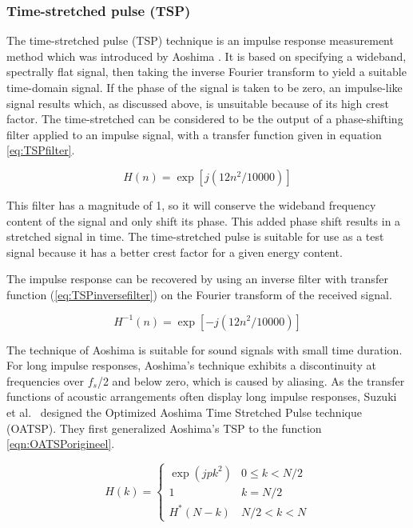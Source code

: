 \subsubsection{Time-stretched pulse (TSP)}
The time-stretched pulse (TSP) technique is an impulse response measurement method which was introduced by Aoshima \cite{Aoshima19811484}. It is based on specifying a wideband, spectrally flat signal, then taking the inverse Fourier transform to yield a suitable time-domain signal. If the phase of the signal is taken to be zero, an impulse-like signal results which, as discussed above, is unsuitable because of its high crest factor. The time-stretched can be considered to be the output of a phase-shifting filter applied to an impulse signal, with a transfer function given in equation \ref{eq:TSPfilter}.

\begin{equation}
H(n) = \exp[j(12n^{2}/10000)]
\label{eq:TSPfilter}
\end{equation}

This filter has a magnitude of 1, so it will conserve the wideband frequency content of the signal and only shift its phase. This added phase shift results in a stretched signal in time. The time-stretched pulse is suitable for use as a test signal because it has a better crest factor for a given energy content.

The impulse response can be recovered by using an inverse filter with transfer function (\ref{eq:TSPinversefilter}) on the Fourier transform of the received signal.

\begin{equation}
H^{-1}(n) = \exp[-j(12n^{2}/10000)]
\label{eq:TSPinversefilter}
\end{equation}

The technique of Aoshima is suitable for sound signals with small time duration. For long impulse responses, Aoshima's technique exhibits a discontinuity at frequencies over $f_{s}$/2 and below zero, which is caused by aliasing. As the transfer functions of acoustic arrangements often display long impulse responses, Suzuki et al.\ \cite{Suzuki19951119} designed the Optimized Aoshima Time Stretched Pulse technique (OATSP). They first generalized Aoshima's TSP to the function \ref{eqn:OATSPorigineel}.

\begin{equation}
\label{eqn:OATSPorigineel}
H(k)=\left\{
\begin{array}{ll}
\exp(jpk^2)& 0 \leq k < N/2\\
1&k=N/2\\
H^{*} (N-k) & N/2 < k < N
\end{array}
\right.
\end{equation}
    
